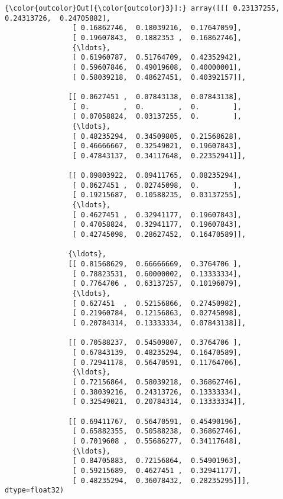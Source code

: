\documentclass[11pt]{article}
\begin{document}
\begin{Verbatim}[commandchars=\\\{\}]
{\color{outcolor}Out[{\color{outcolor}3}]:} array([[[ 0.23137255,  0.24313726,  0.24705882],
                [ 0.16862746,  0.18039216,  0.17647059],
                [ 0.19607843,  0.1882353 ,  0.16862746],
                {\ldots}, 
                [ 0.61960787,  0.51764709,  0.42352942],
                [ 0.59607846,  0.49019608,  0.40000001],
                [ 0.58039218,  0.48627451,  0.40392157]],
        
               [[ 0.0627451 ,  0.07843138,  0.07843138],
                [ 0.        ,  0.        ,  0.        ],
                [ 0.07058824,  0.03137255,  0.        ],
                {\ldots}, 
                [ 0.48235294,  0.34509805,  0.21568628],
                [ 0.46666667,  0.32549021,  0.19607843],
                [ 0.47843137,  0.34117648,  0.22352941]],
        
               [[ 0.09803922,  0.09411765,  0.08235294],
                [ 0.0627451 ,  0.02745098,  0.        ],
                [ 0.19215687,  0.10588235,  0.03137255],
                {\ldots}, 
                [ 0.4627451 ,  0.32941177,  0.19607843],
                [ 0.47058824,  0.32941177,  0.19607843],
                [ 0.42745098,  0.28627452,  0.16470589]],
        
               {\ldots}, 
               [[ 0.81568629,  0.66666669,  0.3764706 ],
                [ 0.78823531,  0.60000002,  0.13333334],
                [ 0.7764706 ,  0.63137257,  0.10196079],
                {\ldots}, 
                [ 0.627451  ,  0.52156866,  0.27450982],
                [ 0.21960784,  0.12156863,  0.02745098],
                [ 0.20784314,  0.13333334,  0.07843138]],
        
               [[ 0.70588237,  0.54509807,  0.3764706 ],
                [ 0.67843139,  0.48235294,  0.16470589],
                [ 0.72941178,  0.56470591,  0.11764706],
                {\ldots}, 
                [ 0.72156864,  0.58039218,  0.36862746],
                [ 0.38039216,  0.24313726,  0.13333334],
                [ 0.32549021,  0.20784314,  0.13333334]],
        
               [[ 0.69411767,  0.56470591,  0.45490196],
                [ 0.65882355,  0.50588238,  0.36862746],
                [ 0.7019608 ,  0.55686277,  0.34117648],
                {\ldots}, 
                [ 0.84705883,  0.72156864,  0.54901963],
                [ 0.59215689,  0.4627451 ,  0.32941177],
                [ 0.48235294,  0.36078432,  0.28235295]]], dtype=float32)
\end{Verbatim}
            
\end{document}
